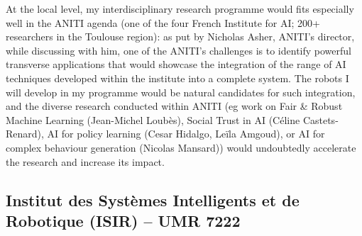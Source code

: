 At the local level, my interdisciplinary research programme would fits
especially well in the ANITI agenda (one of the four French Institute for AI;
200+ researchers in the Toulouse region): as put by Nicholas Asher, ANITI's
director, while discussing with him, one of the ANITI's challenges is to
identify powerful transverse applications that would showcase the integration of
the range of AI techniques developed within the institute into a complete
system. The robots I will develop in my programme would be natural candidates
for such integration, and the diverse research conducted within ANITI (eg work on Fair \& Robust Machine
Learning (Jean-Michel Loubès), Social Trust in AI (Céline Castets-Renard), AI
for policy learning (Cesar Hidalgo, Leïla Amgoud), or AI for complex behaviour
generation (Nicolas Mansard)) would undoubtedly accelerate the research and
increase its impact.

%
%
%
%
%
%
%
%
%
%

\subsection{Institut des Systèmes Intelligents et de Robotique (ISIR) -- UMR 7222}


